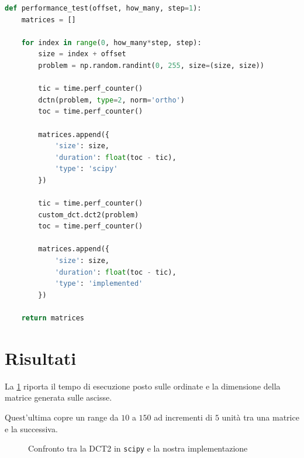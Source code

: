 \documentclass[11pt,italian]{article}
\begin{document}
\newpage
\begin{lstlisting}[language=python,emph={math,np},label=code:main-function,caption=Funzione per il confronto tra implementazioni]
def performance_test(offset, how_many, step=1):
    matrices = []

    for index in range(0, how_many*step, step):
        size = index + offset
        problem = np.random.randint(0, 255, size=(size, size))

        tic = time.perf_counter()
        dctn(problem, type=2, norm='ortho')
        toc = time.perf_counter()

        matrices.append({
            'size': size,
            'duration': float(toc - tic),
            'type': 'scipy'
        })

        tic = time.perf_counter()
        custom_dct.dct2(problem)
        toc = time.perf_counter()

        matrices.append({
            'size': size,
            'duration': float(toc - tic),
            'type': 'implemented'
        })

    return matrices
\end{lstlisting}

\newpage
\section{Risultati}
\label{section:results}
La \cref{fig:execution-time} riporta il tempo di esecuzione posto sulle ordinate e la dimensione della matrice generata sulle ascisse.

Quest'ultima copre un range da $10$ a $150$ ad incrementi di $5$ unità tra una matrice e la successiva.

\begin{figure}[H]
    \caption{Confronto tra la DCT2 in \lstinline{scipy} e la nostra implementazione}
    \label{fig:execution-time}
\end{figure}
\end{document}
